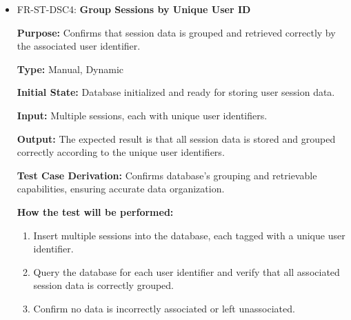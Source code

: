 \documentclass[12pt, titlepage]{article}
\begin{document}
\begin{itemize}
  \item FR-ST-DSC4: \textbf{Group Sessions by Unique User ID}
  \begin{mdframed}[linewidth=0.5mm]
      \textbf{Purpose:} Confirms that session data is grouped and retrieved correctly by the associated user identifier. \par
      \textbf{Type:} Manual, Dynamic \par
      \textbf{Initial State:} Database initialized and ready for storing user session data. \par
      \textbf{Input:} Multiple sessions, each with unique user identifiers. \par
      \textbf{Output:} The expected result is that all session data is stored and grouped correctly according to the unique user identifiers. \par
      \textbf{Test Case Derivation:} Confirms database's grouping and retrievable capabilities, ensuring accurate data organization.\par
      \textbf{How the test will be performed:}
      \begin{enumerate}[noitemsep]
        \item Insert multiple sessions into the database, each tagged with a unique user identifier.
        \item Query the database for each user identifier and verify that all associated session data is correctly grouped.
        \item Confirm no data is incorrectly associated or left unassociated.
      \end{enumerate}
  \end{mdframed}


\end{itemize}
\end{document}
